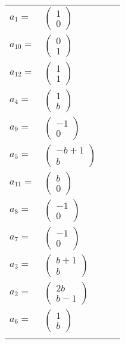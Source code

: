 \documentclass[1p]{elsarticle_modified}
\theoremstyle{definition}
\begin{document}
\begin{tabular}{m{7pt} m{180pt} m{7pt} m{180pt} }
\flushright $a_{1}=$&$\begin{pmatrix}1\\0\end{pmatrix}$ \\
\flushright $a_{10}=$&$\begin{pmatrix}0\\1\end{pmatrix}$ \\
\flushright $a_{12}=$&$\begin{pmatrix}1\\1\end{pmatrix}$ \\
\flushright $a_{4}=$&$\begin{pmatrix}1\\b\end{pmatrix}$ \\
\flushright $a_{9}=$&$\begin{pmatrix}-1\\0\end{pmatrix}$ \\
\flushright $a_{5}=$&$\begin{pmatrix}- b+1\\b\end{pmatrix}$ \\
\flushright $a_{11}=$&$\begin{pmatrix}b\\0\end{pmatrix}$ \\
\flushright $a_{8}=$&$\begin{pmatrix}-1\\0\end{pmatrix}$ \\
\flushright $a_{7}=$&$\begin{pmatrix}-1\\0\end{pmatrix}$ \\
\flushright $a_{3}=$&$\begin{pmatrix}b+1\\b\end{pmatrix}$ \\
\flushright $a_{2}=$&$\begin{pmatrix}2 b\\b-1\end{pmatrix}$ \\
\flushright $a_{6}=$&$\begin{pmatrix}1\\b\end{pmatrix}$\\&\end{tabular}
\end{document}
